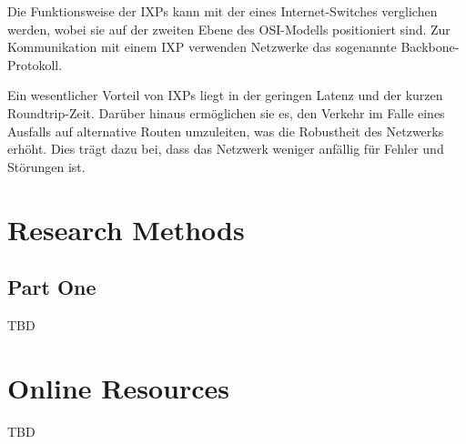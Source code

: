 \documentclass[sigplan,screen]{acmart}
\begin{document}
Die Funktionsweise der IXPs kann mit der eines Internet-Switches verglichen werden, wobei sie auf der zweiten Ebene des OSI-Modells positioniert sind. Zur Kommunikation mit einem IXP verwenden Netzwerke das sogenannte Backbone-Protokoll.

Ein wesentlicher Vorteil von IXPs liegt in der geringen Latenz und der kurzen Roundtrip-Zeit. Darüber hinaus ermöglichen sie es, den Verkehr im Falle eines Ausfalls auf alternative Routen umzuleiten, was die Robustheit des Netzwerks erhöht. Dies trägt dazu bei, dass das Netzwerk weniger anfällig für Fehler und Störungen ist.




\appendix

\section{Research Methods}

\subsection{Part One}

TBD


\section{Online Resources}

TBD
\end{document}
